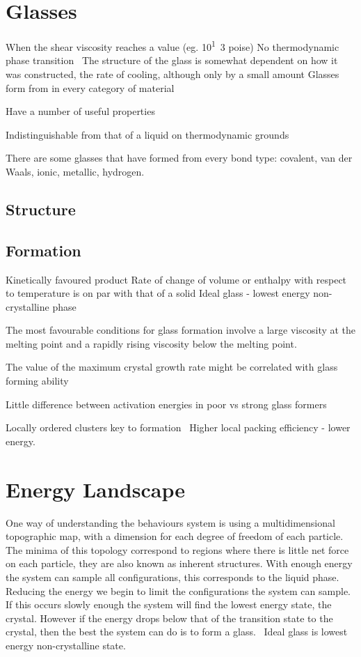 \section{Glasses}
When the shear viscosity reaches a value (eg. \si{10^13} poise)
No thermodynamic phase transition~\cite{santen:00}
The structure of the glass is somewhat dependent on how it was constructed, the rate of cooling, although only by a small amount
Glasses form from in every category of material~\cite{turnbull:69}

Have a number of useful properties~\cite{greer:07}

Indistinguishable from that of a liquid on thermodynamic grounds~\cite{santen:00}

There are some glasses that have formed from every bond type: covalent, van der Waals, ionic, metallic, hydrogen.~\cite{turnbull:69}

\subsection{Structure}


\subsection{Formation}
Kinetically favoured product
Rate of change of volume or enthalpy with respect to temperature is on par with that of a solid
Ideal glass - lowest energy non-crystalline phase

The most favourable conditions for glass formation involve a large viscosity at the melting point and a rapidly rising viscosity below the melting point.~\cite{uhlmann:72}



The value of the maximum crystal growth rate might be correlated with glass forming ability~\cite{tang:13}

Little difference between activation energies in poor vs strong glass formers~\cite{tang:13}

Locally ordered clusters key to formation~\cite{yang:12} Higher local packing efficiency - lower energy. 

\section{Energy Landscape}
One way of understanding the behaviours system is using a multidimensional topographic map, with a dimension for each degree of freedom of each particle. The minima of this topology correspond to regions where there is little net force on each particle, they are also known as inherent structures. With enough energy the system can sample all configurations, this corresponds to the liquid phase. Reducing the energy we begin to limit the configurations the system can sample. If this occurs slowly enough the system will find the lowest energy state, the crystal. However if the energy drops below that of the transition state to the crystal, then the best the system can do is to form a glass.~\cite{stillinger:95} Ideal glass is lowest energy non-crystalline state.

